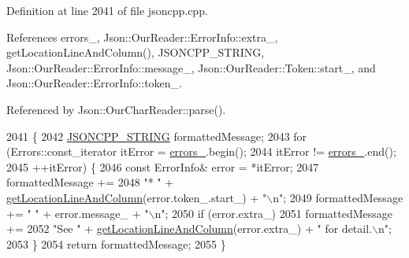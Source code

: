 Definition at line 2041 of file jsoncpp.\+cpp.



References errors\+\_\+, Json\+::\+Our\+Reader\+::\+Error\+Info\+::extra\+\_\+, get\+Location\+Line\+And\+Column(), J\+S\+O\+N\+C\+P\+P\+\_\+\+S\+T\+R\+I\+NG, Json\+::\+Our\+Reader\+::\+Error\+Info\+::message\+\_\+, Json\+::\+Our\+Reader\+::\+Token\+::start\+\_\+, and Json\+::\+Our\+Reader\+::\+Error\+Info\+::token\+\_\+.



Referenced by Json\+::\+Our\+Char\+Reader\+::parse().


\begin{DoxyCode}
2041                                                           \{
2042   \hyperlink{json_8h_a1e723f95759de062585bc4a8fd3fa4be}{JSONCPP\_STRING} formattedMessage;
2043   \textcolor{keywordflow}{for} (Errors::const\_iterator itError = \hyperlink{class_json_1_1_our_reader_afb76b68ba1ab68fe09cf2838e3d4898d}{errors\_}.begin();
2044        itError != \hyperlink{class_json_1_1_our_reader_afb76b68ba1ab68fe09cf2838e3d4898d}{errors\_}.end();
2045        ++itError) \{
2046     \textcolor{keyword}{const} ErrorInfo& error = *itError;
2047     formattedMessage +=
2048         \textcolor{stringliteral}{"* "} + \hyperlink{class_json_1_1_our_reader_af482c8e718615646e13a996292e18d74}{getLocationLineAndColumn}(error.token\_.start\_) + \textcolor{stringliteral}{"\(\backslash\)n"};
2049     formattedMessage += \textcolor{stringliteral}{"  "} + error.message\_ + \textcolor{stringliteral}{"\(\backslash\)n"};
2050     \textcolor{keywordflow}{if} (error.extra\_)
2051       formattedMessage +=
2052           \textcolor{stringliteral}{"See "} + \hyperlink{class_json_1_1_our_reader_af482c8e718615646e13a996292e18d74}{getLocationLineAndColumn}(error.extra\_) + \textcolor{stringliteral}{" for detail.\(\backslash\)n"};
2053   \}
2054   \textcolor{keywordflow}{return} formattedMessage;
2055 \}
\end{DoxyCode}
\mbox{\label{class_json_1_1_our_reader_af482c8e718615646e13a996292e18d74}} 
